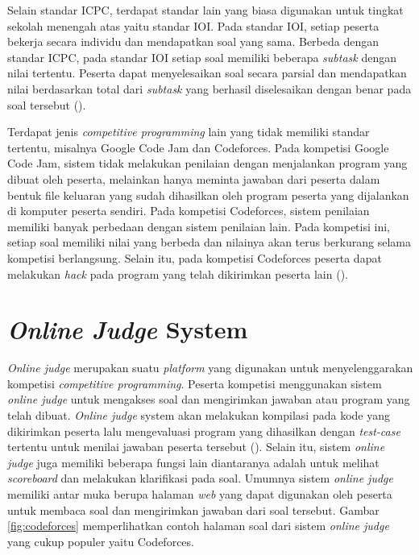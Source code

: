\par Selain standar ICPC, terdapat standar lain yang biasa digunakan untuk tingkat sekolah menengah atas yaitu standar IOI. Pada standar IOI, setiap peserta bekerja secara individu dan mendapatkan soal yang sama. Berbeda dengan standar ICPC, pada standar IOI setiap soal memiliki beberapa \textit{subtask} dengan nilai tertentu. Peserta dapat menyelesaikan soal secara parsial dan mendapatkan nilai berdasarkan total dari \textit{subtask} yang berhasil diselesaikan dengan benar pada soal tersebut (\cite{ioi2017}).
\par Terdapat jenis \textit{competitive programming} lain yang tidak memiliki standar tertentu, misalnya Google Code Jam dan Codeforces. Pada kompetisi Google Code Jam, sistem tidak melakukan penilaian dengan menjalankan program yang dibuat oleh peserta, melainkan hanya meminta jawaban dari peserta dalam bentuk file keluaran yang sudah dihasilkan oleh program peserta yang dijalankan di komputer peserta sendiri. Pada kompetisi Codeforces, sistem penilaian memiliki banyak perbedaan dengan sistem penilaian lain. Pada kompetisi ini, setiap soal memiliki nilai yang berbeda dan nilainya akan terus berkurang selama kompetisi berlangsung. Selain itu, pada kompetisi Codeforces peserta dapat melakukan \textit{hack} pada program yang telah dikirimkan peserta lain (\cite{cfrules}).

\section{\textit{Online Judge} System}

\par \textit{Online judge} merupakan suatu \textit{platform} yang digunakan untuk menyelenggarakan kompetisi \textit{competitive programming}. Peserta kompetisi menggunakan sistem \textit{online judge} untuk mengakses soal dan mengirimkan jawaban atau program yang telah dibuat. \textit{Online judge} system akan melakukan kompilasi pada kode yang dikirimkan peserta lalu mengevaluasi program yang dihasilkan dengan \textit{test-case} tertentu untuk menilai jawaban peserta tersebut (\cite{wasikojsurvey}). Selain itu, sistem \textit{online judge} juga memiliki beberapa fungsi lain diantaranya adalah untuk melihat \textit{scoreboard} dan melakukan klarifikasi pada soal. Umumnya sistem \textit{online judge} memiliki antar muka berupa halaman \textit{web} yang dapat digunakan oleh peserta untuk membaca soal dan mengirimkan jawaban dari soal tersebut. Gambar \ref{fig:codeforces} memperlihatkan contoh halaman soal dari sistem \textit{online judge} yang cukup populer yaitu Codeforces.

